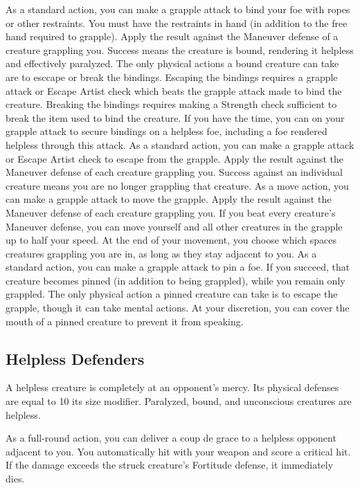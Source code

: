              As a standard action, you can make a grapple attack to bind your foe with ropes or other restraints. You must have the restraints in hand (in addition to the free hand required to grapple). Apply the result against the Maneuver defense of a creature grappling you. Success means the creature is bound, rendering it helpless and effectively paralyzed. The only physical actions a bound creature can take are to esccape or break the bindings. Escaping the bindings requires a grapple attack or Escape Artist check which beats the grapple attack made to bind the creature. Breaking the bindings requires making a Strength check sufficient to break the item used to bind the creature. If you have the time, you can  on your grapple attack to secure bindings on a helpless foe, including a foe rendered helpless through this attack.
             As a standard action, you can make a grapple attack or Escape Artist check to escape from the grapple. Apply the result against the Maneuver defense of each creature grappling you. Success against an individual creature means you are no longer grappling that creature.
             As a move action, you can make a grapple attack to move the grapple. Apply the result against the Maneuver defense of each creature grappling you. If you beat every creature's Maneuver defense, you can move yourself and all other creatures in the grapple up to half your speed. At the end of your movement, you choose which spaces creatures grappling you are in, as long as they stay adjacent to you.
             As a standard action, you can make a grapple attack to pin a foe. If you succeed, that creature becomes pinned (in addition to being grappled), while you remain only grappled. The only physical action a pinned creature can take is to escape the grapple, though it can take mental actions. At your discretion, you can cover the mouth of a pinned creature to prevent it from speaking.

    \subsection{Helpless Defenders}
        A helpless creature is completely at an opponent's mercy. Its physical defenses are equal to 10 \add its size modifier. Paralyzed, bound, and unconscious creatures are helpless.

        \label{Coup de Grace} As a full-round action, you can deliver a coup de grace to a helpless opponent adjacent to you. You automatically hit with your weapon and score a critical hit. If the damage exceeds the struck creature's Fortitude defense, it immediately dies.

